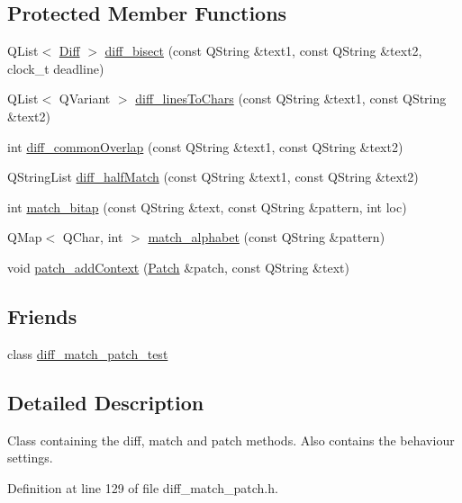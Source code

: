 \subsection*{Protected Member Functions}
\begin{DoxyCompactItemize}
\item 
QList$<$ \hyperlink{class_diff}{Diff} $>$ \hyperlink{classdiff__match__patch_a10f6b81afc589a091a74d00d58ec1a5a}{diff\_\-bisect} (const QString \&text1, const QString \&text2, clock\_\-t deadline)
\item 
QList$<$ QVariant $>$ \hyperlink{classdiff__match__patch_ab1f120b83d49948767de531ab2a4e15a}{diff\_\-linesToChars} (const QString \&text1, const QString \&text2)
\item 
int \hyperlink{classdiff__match__patch_aa47c81e235ed1609fb915f03316d21dc}{diff\_\-commonOverlap} (const QString \&text1, const QString \&text2)
\item 
QStringList \hyperlink{classdiff__match__patch_a34e2eabd2503e28eebe97a05dc3783dc}{diff\_\-halfMatch} (const QString \&text1, const QString \&text2)
\item 
int \hyperlink{classdiff__match__patch_a9d8ebaab2f4cd4fb2ab01a3110c56b86}{match\_\-bitap} (const QString \&text, const QString \&pattern, int loc)
\item 
QMap$<$ QChar, int $>$ \hyperlink{classdiff__match__patch_a106c32e9978fc36cafe6f1bc8f81bf8d}{match\_\-alphabet} (const QString \&pattern)
\item 
void \hyperlink{classdiff__match__patch_a330cc0e446453f69d18a90ba9887c7db}{patch\_\-addContext} (\hyperlink{class_patch}{Patch} \&patch, const QString \&text)
\end{DoxyCompactItemize}
\subsection*{Friends}
\begin{DoxyCompactItemize}
\item 
class \hyperlink{classdiff__match__patch_ab85b721264b16d0a4d42230097d485ca}{diff\_\-match\_\-patch\_\-test}
\end{DoxyCompactItemize}


\subsection{Detailed Description}
Class containing the diff, match and patch methods. Also contains the behaviour settings. 

Definition at line 129 of file diff\_\-match\_\-patch.h.



